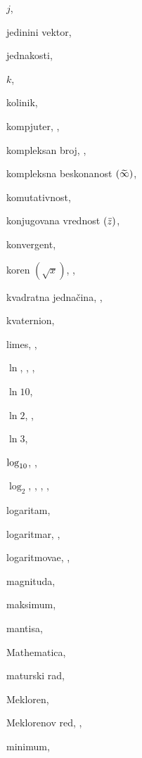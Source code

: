 \begin{theindex}
  \indexspace

  \item $j$, 
  \item jedini{\cv}ni vektor, 
  \item jednakosti, 

  \indexspace

  \item $k$, 
  \item koli{\cv}nik, 
  \item kompjuter, , 
  \item kompleksan broj, , 
  \item kompleksna beskona{\cv}nost $({\,\widetilde{\!\infty\!}\,})$, 
  \item komutativnost, 
  \item konjugovana vrednost $({\bar z})$, 
  \item konvergent, 
  \item koren $(\sqrt x)$, , 
  \item kvadratna jedna{{\v c}}ina, , 
  \item kvaternion, 

  \indexspace

  \item limes, , 
  \item $\ln$, , , 
  \item $\ln 10$, 
  \item $\ln 2$, , 
  \item $\ln3$, 
  \item $\log_{10}$, , 
  \item $\log_2$, , , , 
  \item logaritam, 
  \item logaritmar, , 
  \item logaritmova{\nj}e, , 

  \indexspace

  \item magnituda, 
  \item maksimum, 
  \item mantisa, 
  \item Mathematica, 
  \item maturski rad, 
  \item Mekloren, 
  \item Meklorenov red, , 
  \item minimum, 


\end{theindex}
